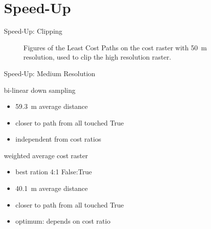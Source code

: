 \documentclass[usenames,dvipsnames,aspectratio=169]{beamer}
\begin{document}
\section{Speed-Up}
	\begin{frame}{Speed-Up: Clipping}
		\begin{figure}
			\centering
			
			\qquad
			
			\caption{Figures of the Least Cost Paths on the cost raster with 50~m resolution, used to clip the high resolution raster.}
			\label{fig:clipping}
		\end{figure}
	\end{frame}


	\begin{frame}{Speed-Up: Medium Resolution}
		\begin{minipage}[t]{0.48\textwidth}
		bi-linear down sampling
		\begin{itemize}
			\item 59.3~m average distance
			\item closer to path from all touched True
			
			\item independent from cost ratios
		\end{itemize}
		\end{minipage}
		\hfill	
		\begin{minipage}[t]{0.48\textwidth}
			weighted average cost raster
			\begin{itemize}
				\item best ration 4:1 False:True
				\item 40.1~m average distance
				\item closer to path from all touched True
				\item optimum: depends on cost ratio
			\end{itemize}
		\end{minipage}
	\end{frame}
\end{document}
